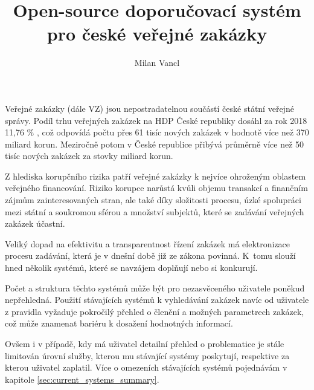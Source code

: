 \documentclass[thesis=M,czech]{FITthesis}[2019/12/23]
\title{Open-source doporučovací systém pro české veřejné zakázky}
\author{Milan Vancl} %
\begin{document}

\begin{introduction}
    Veřejné zakázky (dále VZ) jsou nepostradatelnou součástí české státní veřejné správy. Podíl trhu veřejných zakázek na HDP České republiky dosáhl za rok 2018 11,76 \% \cite{mmr2018}, což odpovídá počtu přes 61 tisíc nových zakázek v hodnotě  více než 370 miliard korun\cite{ceskezakazky}. Meziročně potom v České republice přibývá průměrně více než 50 tisíc nových zakázek za stovky miliard korun.
    
    Z hlediska korupčního rizika patří veřejné zakázky k nejvíce ohroženým oblastem veřejného financování. Riziko korupce narůstá kvůli objemu transakcí a finančním  zájmům  zainteresovaných  stran,  ale  také  díky  složitosti  procesu,  úzké  spolupráci  mezi státní  a  soukromou  sférou  a  množství  subjektů,  které  se  zadávání  veřejných  zakázek  účastní\cite{transparency2019}.
    
    Veliký dopad na efektivitu a transparentnost řízení zakázek má elektronizace procesu zadávání, která je v dnešní době již ze zákona povinná. K~tomu slouží hned několik systémů, které se navzájem doplňují nebo si konkurují.
    
    Počet a struktura těchto systémů může být pro nezasvěceného uživatele poněkud nepřehledná. 
    Použití stávajících systémů k vyhledávání zakázek navíc od uživatele z pravidla vyžaduje pokročilý přehled o členění a možných parametrech zakázek, což může znamenat bariéru k dosažení hodnotných informací.
    
    Ovšem i v případě, kdy má uživatel detailní přehled o problematice je stále limitován úrovní služby, kterou mu stávající systémy poskytují, respektive za kterou uživatel zaplatil. Více o omezeních stávajících systémů pojednávám v kapitole \ref{sec:current_systems_summary}.


    

\end{introduction}
\end{document}
